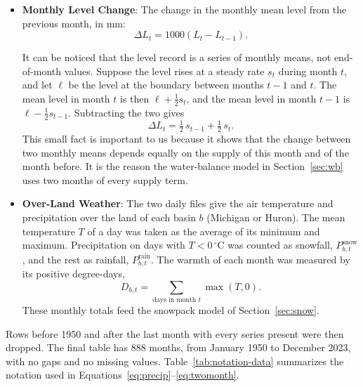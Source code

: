 \documentclass{article}
\begin{document}
\begin{itemize}
\item \textbf{Monthly Level Change}: The change in the monthly mean level from the previous
month, in mm:
\begin{equation}
\Delta L_t = 1000\left(L_t - L_{t-1}\right). \label{eq:dlevel}
\end{equation}

It can be noticed that the level record is a series of monthly means, not end-of-month values.
Suppose the level rises at a steady rate $s_t$ during month $t$, and let $\ell$ be the level at
the boundary between months $t-1$ and $t$. The mean level in month $t$ is then
$\ell + \tfrac{1}{2}s_t$, and the mean level in month $t-1$ is $\ell - \tfrac{1}{2}s_{t-1}$.
Subtracting the two gives
\begin{equation}
\Delta L_t = \tfrac{1}{2}\,s_{t-1} + \tfrac{1}{2}\,s_t. \label{eq:twomonth}
\end{equation}
This small fact is important to us because it shows that the change between two monthly means
depends equally on the supply of this month and of the month before. It is the reason the
water-balance model in Section~\ref{sec:wb} uses two months of every supply term.

\item \textbf{Over-Land Weather}: The two daily files give the air temperature and precipitation
over the land of each basin $b$ (Michigan or Huron). The mean temperature $T$ of a day was taken as
the average of its minimum and maximum. Precipitation on days with $T < 0\,^\circ$C was counted as
snowfall, $P^{\mathrm{snow}}_{b,t}$, and the rest as rainfall, $P^{\mathrm{rain}}_{b,t}$. The
warmth of each month was measured by its positive degree-days,
\begin{equation}
D_{b,t} = \sum_{\text{days in month } t} \max(T, 0). \label{eq:pdd}
\end{equation}
These monthly totals feed the snowpack model of Section~\ref{sec:snow}.
\end{itemize}

Rows before 1950 and after the last month with every series present were then dropped. The
final table has 888 months, from January 1950 to December 2023, with no gaps and no missing
values. Table~\ref{tab:notation-data} summarizes the notation used in
Equations~\ref{eq:precip}--\ref{eq:twomonth}.
\end{document}
